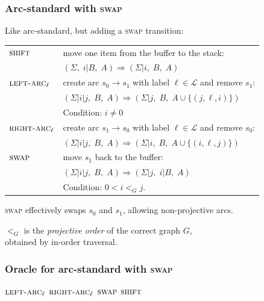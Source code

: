 \documentclass[t]{beamer}
\begin{document}
\begin{frame}
  \frametitle{Arc-standard with \textsc{swap} \cite{nivre2009non}}
  Like arc-standard, but adding a \textsc{swap} transition:

  \begin{tabular}{ll}
    $\textsc{shift}$ & move one item from the buffer to the stack: \\
    & $(\Sigma, \; i | B, \; A) \Rightarrow (\Sigma | i, \; B, \; A)$ \\
    \hline
    $\textsc{left-arc}_\ell$ & create arc $s_0 \to s_1$ with label $\ell \in \mathcal{L}$ and remove $s_1$: \\
    & $(\Sigma | i|j, \; B, \; A) \Rightarrow (\Sigma | j, \; B, \; A \cup \{(j,\ell,i)\})$ \\
    & Condition: $i\neq0$ \\
    \hline
    $\textsc{right-arc}_\ell$ & create arc $s_1 \to s_0$ with label $\ell \in \mathcal{L}$ and remove $s_0$: \\
    & $(\Sigma | i|j, \; B, \; A) \Rightarrow (\Sigma | i, \; B, \; A \cup \{(i,\ell,j)\})$ \\
    \hline
    $\textsc{swap}$ & move $s_1$ back to the buffer: \\
    & $(\Sigma | i|j, \; B, \; A) \Rightarrow (\Sigma | j, \; i | B, \; A)$ \\
    & Condition: $0<i<_Gj$.
  \end{tabular}
  
  \pause\vfill
  
  \textsc{swap} effectively swaps $s_0$ and $s_1$, allowing non-projective arcs.
    
    \pause\vfill
    
    $<_G$ is the \textit{projective order} of the correct graph $G$, \\
    obtained by in-order traversal.
\end{frame}

\begin{frame}
    \frametitle{Oracle for arc-standard with \textsc{swap}}
    \begin{algorithmic}[0]
            \RETURN $\textsc{left-arc}_\ell$
            \RETURN $\textsc{right-arc}_\ell$
            \RETURN $\textsc{swap}$
        \ELSE
            \RETURN $\textsc{shift}$
        \ENDIF
    \ENDWHILE
    \end{algorithmic}
\end{frame}
\end{document}
